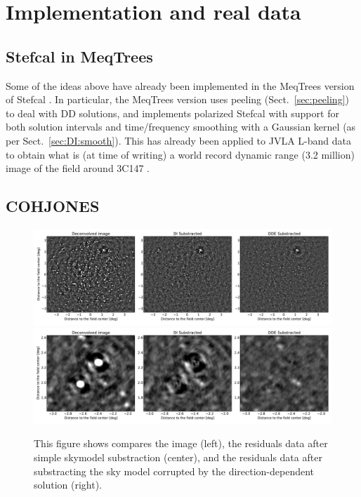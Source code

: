 \documentclass[useAMS,usenatbib]{mn2e}
\begin{document}
\section{Implementation and real data}

\subsection{Stefcal in MeqTrees}

Some of the ideas above have already been implemented in the MeqTrees \citep{meqtrees} version of Stefcal 
\citep{OMS-Stefcal}. In particular, the MeqTrees version uses peeling (Sect.~\ref{sec:peeling}) to deal with
DD solutions, and implements polarized Stefcal with support for both solution intervals and time/frequency smoothing 
with a Gaussian kernel (as per Sect.~\ref{sec:DI:smooth}). This has already been applied to JVLA L-band data 
to obtain what is (at time of writing) a world record dynamic range (3.2 million) image of the field 
around 3C147 \citep{Perley-3C147}.

\subsection{COHJONES}



\begin{figure}
\begin{center}
\includegraphics[width=\textwidth]{resid}
\includegraphics[width=\textwidth]{residZoom}
\caption{\label{fig:resid} This figure shows compares the image
  (left), the residuals data after simple skymodel substraction
  (center), and the residuals data after substracting the
  sky model corrupted by the direction-dependent solution (right).}
\end{center}
\end{figure}
\end{document}
